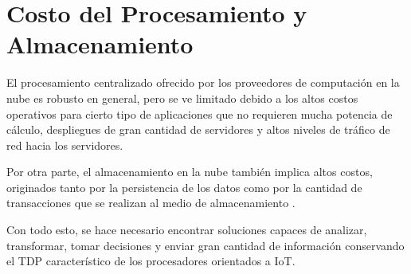 
\section{Costo del Procesamiento y Almacenamiento}

El procesamiento centralizado ofrecido por los proveedores de computación en la nube es robusto en general, pero se ve limitado debido a los altos costos operativos para cierto tipo de  aplicaciones que no requieren mucha potencia de cálculo, despliegues de gran cantidad de servidores y altos niveles de tráfico de red hacia los servidores.

Por otra parte, el almacenamiento en la nube también implica altos costos, originados tanto por la persistencia de los datos como por la cantidad de transacciones que se realizan al medio de almacenamiento \citep{AzurePrice,AWSPrice,GCPrice,UPrice}.

Con todo esto, se hace necesario encontrar soluciones capaces de  analizar, transformar, tomar decisiones y enviar gran cantidad de información conservando el TDP característico de los procesadores orientados a IoT.
